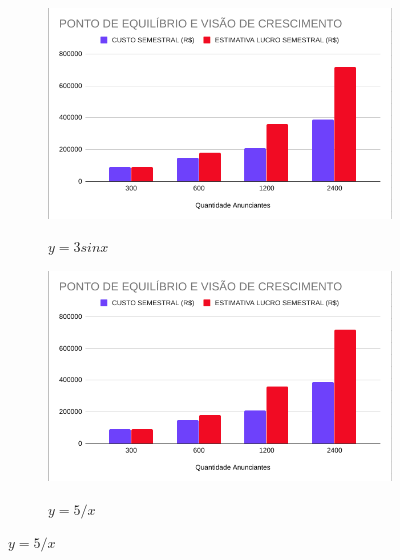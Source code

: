 \documentclass{article}
\begin{document}
\begin{figure}[H] 
\caption{Two simple graphs}
\label{fig:three graphs}
     \centering
     \begin{subfigure}[H]{0.4\textwidth}
         \centering 
         \caption{$y=3sinx$}
         \includegraphics[width=\textwidth]{PONTOEQ}
         \label{fig:three sin x}
     \end{subfigure}
     \hfill
     \begin{subfigure}[H]{0.4\textwidth}
         \centering 
              \caption{$y=5/x$}
         \includegraphics[width=\textwidth]{PONTOEQ}
         \label{fig:five over x}
     \end{subfigure} 
\end{figure}
\end{document}
